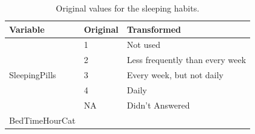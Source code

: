 \begin{table}[H]

    \caption{Original values for the sleeping habits.}

	\tiny

	\centering

    \label{table:Table_Sleeping_Mapping}
    
	\renewcommand{\arraystretch}{1.5}

    \begin{tabular}{l | l | l}
		\hline
        \rowcolor[HTML]{FF9999}		
		
        \textbf{Variable} & \textbf{Original} & \textbf{Transformed} \\ 		
        
        \hline 
                                  
            \multirow{5}{*}{SleepingPills}
                            
            	& \multicolumn{1}{l}{1}     & \multicolumn{1}{l}{Not used}                 \\\cline{2-3}
                & \multicolumn{1}{l}{2}     & \multicolumn{1}{l}{Less frequently than every week}   \\\cline{2-3}
				& \multicolumn{1}{l}{3}     & \multicolumn{1}{l}{Every week, but not daily} \\\cline{2-3}
				& \multicolumn{1}{l}{4}     & \multicolumn{1}{l}{Daily}   \\\cline{2-3}
				& \multicolumn{1}{l}{NA}    & \multicolumn{1}{l}{Didn't Answered}              \\\hline                                                                                                
   
            \multirow{18}{*}{BedTimeHourCat}
                            

\end{tabular}
\end{table}
